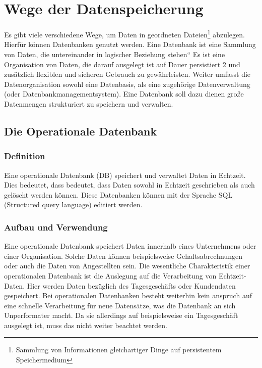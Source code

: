 \chapter{Wege der Datenspeicherung}
Es gibt viele verschiedene Wege, um Daten in geordneten Dateien\footnote{Sammlung von Informationen gleichartiger Dinge auf persistentem Speichermedium} abzulegen. Hierfür
können Datenbanken genutzt werden. Eine Datenbank ist eine Sammlung von Daten,
die untereinander in logischer Beziehung stehen“ Es ist eine Organisation von Daten, die
darauf ausgelegt ist auf Dauer persistiert 2 und zusätzlich flexiblen und sicheren Gebrauch
zu gewährleisten. Weiter umfasst die Datenorganisation sowohl eine Datenbasis, als eine
zugehörige Datenverwaltung (oder Datenbankmanagementsystem). Eine Datenbank soll
dazu dienen große Datenmengen strukturiert zu speichern und verwalten.\cite{Huckert:VL1_2}\cite{Gabler_Wirtschaftslex:Datenbank}
\section{Die Operationale Datenbank}
\subsection{Definition}
Eine operationale Datenbank (DB) speichert und verwaltet Daten in Echtzeit. Dies
bedeutet, dass bedeutet, dass Daten sowohl in Echtzeit geschrieben als auch gelöscht
werden können.\cite{techopedia:Operationale_Datenbank} 
Diese Datenbanken können mit der Sprache SQL (Structured query language) editiert werden.
\subsection{Aufbau und Verwendung}
Eine operationale Datenbank speichert Daten innerhalb eines Unternehmens oder einer Organisation. 
Solche Daten können beispielsweise Gehaltsabrechnungen oder auch die Daten von Angestellten sein. \newline 
Die wesentliche Charakteristik einer operationalen Datenbank ist die Auslegung auf die Verarbeitung von Echtzeit-Daten. 
Hier werden Daten bezüglich des Tagesgeschäfts oder Kundendaten gespeichert.
Bei operationalen Datenbanken besteht weiterhin kein anspruch auf eine schnelle Verarbeitung für neue Datensätze, was die Datenbank an sich Unperformater macht.
Da sie allerdings auf beispielsweise ein Tagesgeschäft ausgelegt ist, muss das nicht weiter beachtet werden.
\cite{ComputerWeekly:Datenbanksysteme} \cite{techopedia:Operationale_Datenbank}
